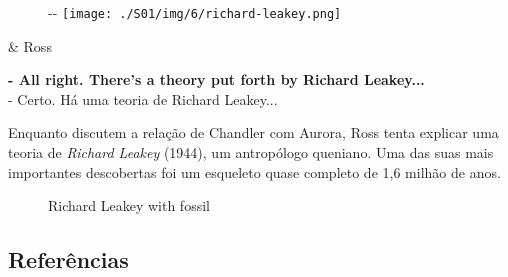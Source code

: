 \begin{figure}[!ht]
  \begin{adjustwidth}{-\oddsidemargin-1in}{-\rightmargin}
    \centering
    \texttt{[image: ./S01/img/6/richard-leakey.png]}
  \end{adjustwidth}
\end{figure}

\begin{tcolorbox}[enhanced,center upper,
    drop fuzzy shadow southeast, boxrule=0.3pt,
    lower separated=false, breakable,
    colframe=black!30!dialogoBorder,colback=white]
\begin{minipage}[c]{0.16\linewidth}
   & \centering \scriptsize{Ross}
\end{minipage}
\hfill
\begin{minipage}[c]{0.8\linewidth}
  \textbf{- All right. There's a theory put forth by Richard Leakey...}\\
  - Certo. Há uma teoria de Richard Leakey...
\end{minipage}
\end{tcolorbox}

Enquanto discutem a relação de Chandler com Aurora, Ross tenta explicar
uma teoria de \emph{Richard Leakey} (1944), um antropólogo queniano. Uma
das suas mais importantes descobertas foi um esqueleto quase completo de
1,6 milhão de anos.

\begin{figure}
  \centering
    \caption{Richard Leakey with fossil\label{fig:richard-leakey-with-fossil}}
\end{figure}

\hypertarget{referuxeancias-1}{%
\subsection{Referências}\label{referuxeancias-1}}

